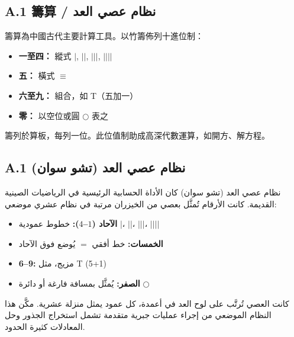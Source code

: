 \documentclass[11pt,a4paper]{article}
\begin{document}
\noindent
\begin{minipage}[t]{0.48\textwidth}
\subsection*{A.1 籌算 / نظام عصي العد}

籌算為中國古代主要計算工具。以竹籌佈列十進位制：
\begin{itemize}[leftmargin=1.5em]
  \item \textbf{一至四：} 縱式 $|$, $||$, $|||$, $||||$
  \item \textbf{五：} 橫式 $\equiv$
  \item \textbf{六至九：} 組合，如 T（五加一）
  \item \textbf{零：} 以空位或圓 $\bigcirc$ 表之
\end{itemize}

籌列於算板，每列一位。此位值制助成高深代數運算，如開方、解方程。
\end{minipage}
\hfill
\begin{minipage}[t]{0.48\textwidth}
\arabicfont\beginR
\subsection*{A.1 نظام عصي العد (تشو سوان)}

نظام عصي العد (تشو سوان) كان الأداة الحسابية الرئيسية في الرياضيات الصينية القديمة. كانت الأرقام تُمثَّل بعصي من الخيزران مرتبة في نظام عشري موضعي:
\begin{itemize}[leftmargin=1.5em]
  \item \textbf{الآحاد ($1$--$4$):} خطوط عمودية $|$، $||$، $|||$، $||||$
  \item \textbf{الخمسات:} خط أفقي $=$ يُوضع فوق الآحاد
  \item \textbf{6--9:} مزيج، مثل T (5+1)
  \item \textbf{الصفر:} يُمثَّل بمسافة فارغة أو دائرة $\bigcirc$
\end{itemize}

كانت العصي تُرتَّب على لوح العد في أعمدة، كل عمود يمثل منزلة عشرية. مكَّن هذا النظام الموضعي من إجراء عمليات جبرية متقدمة تشمل استخراج الجذور وحل المعادلات كثيرة الحدود.
\endR
\end{minipage}

\vspace{0.8cm}
\end{document}
